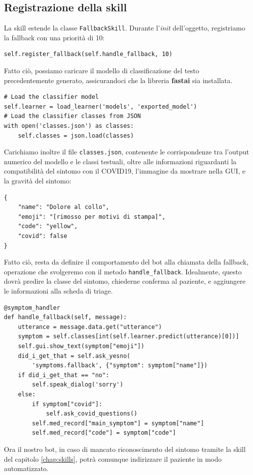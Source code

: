 \subsection{Registrazione della skill}
La skill estende la classe \texttt{FallbackSkill}. Durante l'\textit{init} dell'oggetto, registriamo la fallback con una priorità di 10:
\begin{verbatim}
self.register_fallback(self.handle_fallback, 10)
\end{verbatim}
Fatto ciò, possiamo caricare il modello di classificazione del testo precedentemente generato, assicurandoci che la libreria \textbf{fastai} sia installata.
\begin{verbatim}
# Load the classifier model
self.learner = load_learner('models', 'exported_model')
# Load the classifier classes from JSON
with open('classes.json') as classes:
    self.classes = json.load(classes)
\end{verbatim}
Carichiamo inoltre il file \texttt{classes.json}, contenente le corrispondenze tra l'output numerico del modello e le classi testuali, oltre alle informazioni riguardanti la compatibilità del sintomo con il COVID19, l'immagine da mostrare nella GUI, e la gravità del sintomo:
\begin{verbatim}
{
    "name": "Dolore al collo",
    "emoji": "[rimosso per motivi di stampa]",
    "code": "yellow",
    "covid": false
}
\end{verbatim}
Fatto ciò, resta da definire il comportamento del bot alla chiamata della fallback, operazione che svolgeremo con il metodo \texttt{handle\_fallback}.
Idealmente, questo dovrà predire la classe del sintomo, chiederne conferma al paziente, e aggiungere le informazioni alla scheda di triage.
\begin{verbatim}
@symptom_handler
def handle_fallback(self, message):
    utterance = message.data.get("utterance")
    symptom = self.classes[int(self.learner.predict(utterance)[0])]
    self.gui.show_text(symptom["emoji"])
    did_i_get_that = self.ask_yesno(
        'symptoms.fallback', {"symptom": symptom["name"]})
    if did_i_get_that == "no":
        self.speak_dialog('sorry')
    else:
        if symptom["covid"]:
            self.ask_covid_questions()
        self.med_record["main_symptom"] = symptom["name"]
        self.med_record["code"] = symptom["code"]
\end{verbatim}
Ora il nostro bot, in caso di mancato riconoscimento del sintomo tramite la skill del capitolo \ref{chap:skills}, potrà comunque indirizzare il paziente in modo automatizzato.
